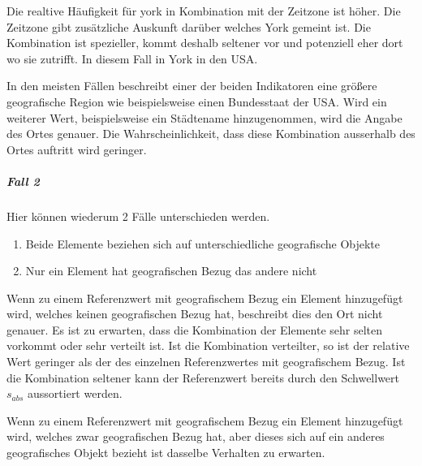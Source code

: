 							Die realtive Häufigkeit für york in Kombination mit der Zeitzone ist höher. 
							Die Zeitzone gibt zusätzliche Auskunft darüber welches York gemeint ist. 
							Die Kombination ist spezieller, kommt deshalb seltener vor und potenziell eher dort wo sie zutrifft. 
							In diesem Fall in York in den USA. 

							In den meisten Fällen beschreibt einer der beiden Indikatoren eine größere geografische Region wie beispielsweise einen Bundesstaat der USA.
							Wird ein weiterer Wert, beispielsweise ein Städtename hinzugenommen, wird die Angabe des Ortes genauer. 
							Die Wahrscheinlichkeit, dass diese Kombination ausserhalb des Ortes auftritt wird geringer. 

					\subparagraph{Fall 2}

						Hier können wiederum 2 Fälle unterschieden werden.

						\begin{enumerate}
							\item Beide Elemente beziehen sich auf unterschiedliche geografische Objekte
							\item Nur ein Element hat geografischen Bezug das andere nicht 
						\end{enumerate}

						Wenn zu einem Referenzwert mit geografischem Bezug ein Element hinzugefügt wird, welches keinen geografischen Bezug hat, beschreibt dies den Ort nicht genauer.
						Es ist zu erwarten, dass die Kombination der Elemente sehr selten vorkommt oder sehr verteilt ist. 
						Ist die Kombination verteilter, so ist der relative Wert geringer als der des einzelnen Referenzwertes mit geografischem Bezug.
						Ist die Kombination seltener kann der Referenzwert bereits durch den Schwellwert $s_{abs}$ aussortiert werden.		

						Wenn zu einem Referenzwert mit geografischem Bezug ein Element hinzugefügt wird, welches zwar geografischen Bezug hat, aber dieses sich auf ein anderes geografisches Objekt bezieht ist dasselbe Verhalten zu erwarten.

	\newpage
	
	
			
		



	